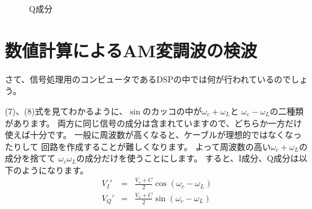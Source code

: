 \begin{figure}
\begin{minipage}{0.5\hsize}
\caption{Q成分}
\end{minipage}
\end{figure}

\section*{数値計算によるAM変調波の検波}
さて、信号処理用のコンピュータであるDSPの中では何が行われているのでしょう。

(7)、(8)式を見てわかるように、$\sin$のカッコの中が$\omega_c+\omega_L$と
$\omega_c-\omega_L$の二種類があります。
両方に同じ信号の成分は含まれていますので、どちらか一方だけ使えば十分です。
一般に周波数が高くなると、ケーブルが理想的ではなくなったりして
回路を作成することが難しくなります。
よって周波数の高い$\omega_c + \omega_L$の成分を捨てて
$\omega_c \omega_L$の成分だけを使うことにします。
すると、I成分、Q成分は以下のようになります。
\begin{eqnarray}
V_I' &=& \frac{V_s+C}{2}\cos(\omega_c - \omega_L) \label{eq:AM_DSP_I}\\
V_Q' &=& \frac{V_s+C}{2}\sin(\omega_c - \omega_L) \label{eq:AM_DSP_Q}
\end{eqnarray}

